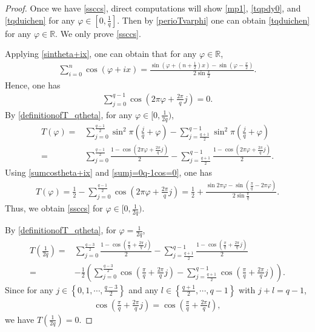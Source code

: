 \documentclass[10pt,a4paper]{amsart}
\begin{document}
	\begin{proof}
		Once we have \eqref{ssccs}, direct computations will show \eqref{mp1}, \eqref{tqpdy0}, and \eqref{tqduichen} for any $\varphi\in\left[0,\frac{1}{q}\right]$. Then by \eqref{perioTvarphi} one can obtain \eqref{tqduichen} for any $\varphi\in\mathbb{R}$.
		We only prove \eqref{ssccs}.
		
		Applying \eqref{sintheta+ix}, one can obtain that for any $\varphi\in\mathbb{R}$,
		\begin{align}
			\sum_{i=0}^n\cos(\varphi+ix)=\frac{\sin\left(\varphi+\left(n+\frac{1}{2}\right)x\right)-\sin\left(\varphi-\frac{x}{2}\right)}{2\sin\frac{x}{2}}.\label{sumcostheta+ix}
		\end{align}
		Hence, one has
		\begin{align}
			\sum_{j=0}^{q-1}\cos\left(2\pi\varphi+\frac{2\pi}{q}j\right)=0.\label{sumj=0q-1cos=0}
		\end{align}
	By \eqref{definitionofT_qtheta}, for any $\varphi\in\Big[0,\frac{1}{2q}\Big)$, 
		\begin{align}
			T(\varphi)
			=&\sum_{j=0}^{\frac{q-1}{2}}\sin^2\pi\left(\frac{j}{q}+\varphi\right )-\sum_{j=\frac{q+1}{2}}^{q-1}\sin^2\pi\left(\frac{j}{q}+\varphi\right)\nonumber\\
			=&\sum_{j=0}^{\frac{q-1}{2}}\frac{1-\cos\left(2\pi\varphi+\frac{2\pi}{q}j\right)}{2}-\sum_{j=\frac{q+1}{2}}^{{q-1}}\frac{1-\cos\left(2\pi\varphi+\frac{2\pi}{q}j\right)}{2}.\nonumber
		\end{align}
Using \eqref{sumcostheta+ix} and \eqref{sumj=0q-1cos=0}, one has
\begin{align}
	T(\varphi)=\frac{1}{2}-\sum_{j=0}^{\frac{q-1}{2}}\cos\left(2\pi\varphi+\frac{2\pi}{q}j\right)=\frac{1}{2}+\frac{\sin2\pi\varphi-\sin\left(\frac{\pi}{q}-2\pi\varphi\right)}{2\sin\frac{\pi}{q}}.\nonumber
\end{align}
Thus, we obtain \eqref{ssccs} for  $\varphi\in [0,\frac{1}{2q})$.

By \eqref{definitionofT_qtheta},  for $\varphi=\frac{1}{2q}$,
\begin{align}
	T\left(\frac{1}{2q}\right)
	=&\sum_{j=0}^{\frac{q-3}{2}}\frac{1-\cos\left(\frac{\pi}{q}+\frac{2\pi}{q}j\right)}{2}-\sum_{j=\frac{q+1}{2}}^{{q-1}}\frac{1-\cos\left(\frac{\pi}{q}+\frac{2\pi}{q}j\right)}{2}\nonumber\\
	=&-\frac{1}{2}\left(\sum_{j=0}^{\frac{q-3}{2}}\cos\left(\frac{\pi}{q}+\frac{2\pi}{q}j\right)-\sum_{j=\frac{q+1}{2}}^{{q-1}}\cos\left(\frac{\pi}{q}+\frac{2\pi}{q}j\right)\right).\nonumber
\end{align}
Since for any $j\in\left\{0,1,\cdots,\frac{q-3}{2}\right\}$ and any $l\in\left\{\frac{q+1}{2},\cdots,q-1\right\}$ with $j+l=q-1$, 
\begin{align}
\cos\left(\frac{\pi}{q}+\frac{2\pi}{q}j\right)=\cos\left(\frac{\pi}{q}+\frac{2\pi}{q}l\right),\nonumber
\end{align}
we have $T\left(\frac{1}{2q}\right)=0$.


\end{proof}
\end{document}
